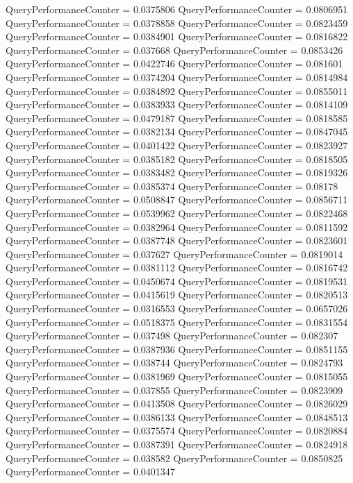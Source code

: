 \documentclass[9pt]{article}
\theoremstyle{plain}
\theoremstyle{definition}
\theoremstyle{remark}
\numberwithin{equation}{section}
\begin{document}
QueryPerformanceCounter  =  0.0375806
QueryPerformanceCounter  =  0.0806951
QueryPerformanceCounter  =  0.0378858
QueryPerformanceCounter  =  0.0823459
QueryPerformanceCounter  =  0.0384901
QueryPerformanceCounter  =  0.0816822
QueryPerformanceCounter  =  0.037668
QueryPerformanceCounter  =  0.0853426
QueryPerformanceCounter  =  0.0422746
QueryPerformanceCounter  =  0.081601
QueryPerformanceCounter  =  0.0374204
QueryPerformanceCounter  =  0.0814984
QueryPerformanceCounter  =  0.0384892
QueryPerformanceCounter  =  0.0855011
QueryPerformanceCounter  =  0.0383933
QueryPerformanceCounter  =  0.0814109
QueryPerformanceCounter  =  0.0479187
QueryPerformanceCounter  =  0.0818585
QueryPerformanceCounter  =  0.0382134
QueryPerformanceCounter  =  0.0847045
QueryPerformanceCounter  =  0.0401422
QueryPerformanceCounter  =  0.0823927
QueryPerformanceCounter  =  0.0385182
QueryPerformanceCounter  =  0.0818505
QueryPerformanceCounter  =  0.0383482
QueryPerformanceCounter  =  0.0819326
QueryPerformanceCounter  =  0.0385374
QueryPerformanceCounter  =  0.08178
QueryPerformanceCounter  =  0.0508847
QueryPerformanceCounter  =  0.0856711
QueryPerformanceCounter  =  0.0539962
QueryPerformanceCounter  =  0.0822468
QueryPerformanceCounter  =  0.0382964
QueryPerformanceCounter  =  0.0811592
QueryPerformanceCounter  =  0.0387748
QueryPerformanceCounter  =  0.0823601
QueryPerformanceCounter  =  0.037627
QueryPerformanceCounter  =  0.0819014
QueryPerformanceCounter  =  0.0381112
QueryPerformanceCounter  =  0.0816742
QueryPerformanceCounter  =  0.0450674
QueryPerformanceCounter  =  0.0819531
QueryPerformanceCounter  =  0.0415619
QueryPerformanceCounter  =  0.0820513
QueryPerformanceCounter  =  0.0316553
QueryPerformanceCounter  =  0.0657026
QueryPerformanceCounter  =  0.0518375
QueryPerformanceCounter  =  0.0831554
QueryPerformanceCounter  =  0.037498
QueryPerformanceCounter  =  0.082307
QueryPerformanceCounter  =  0.0387936
QueryPerformanceCounter  =  0.0851155
QueryPerformanceCounter  =  0.038744
QueryPerformanceCounter  =  0.0824793
QueryPerformanceCounter  =  0.0381969
QueryPerformanceCounter  =  0.0815055
QueryPerformanceCounter  =  0.037855
QueryPerformanceCounter  =  0.0823909
QueryPerformanceCounter  =  0.0413508
QueryPerformanceCounter  =  0.0826029
QueryPerformanceCounter  =  0.0386133
QueryPerformanceCounter  =  0.0848513
QueryPerformanceCounter  =  0.0375574
QueryPerformanceCounter  =  0.0820884
QueryPerformanceCounter  =  0.0387391
QueryPerformanceCounter  =  0.0824918
QueryPerformanceCounter  =  0.038582
QueryPerformanceCounter  =  0.0850825
QueryPerformanceCounter  =  0.0401347
\end{document}
